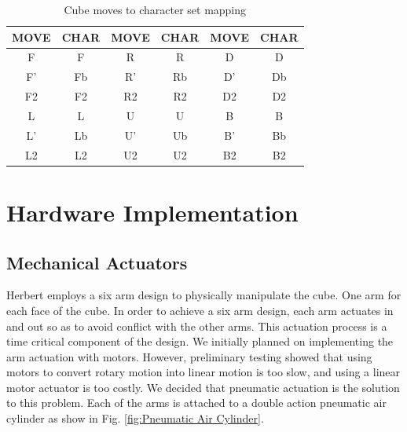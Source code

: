 \documentclass[final, letterpaper, 10 pt, conference, twocolumn]{IEEEtran}
\begin{document}
\begin{table}[!ht]
\caption{Cube moves to character set mapping}
\label{table:moves table}
\centering
\begin{tabular}{|c|c|c|c|c|c|}
\hline
\textbf{MOVE} & \textbf{CHAR} & \textbf{MOVE} & \textbf{CHAR} & \textbf{MOVE} & \textbf{CHAR} \\ \hline
F             & F              & R             & R              & D             & D             \\ \hline
F'            & Fb              & R'            & Rb              & D'            & Db            \\ \hline
F2            & F2              & R2            & R2              & D2            & D2             \\ \hline
L             & L              & U             & U             & B             & B             \\ \hline
L'            & Lb              & U'            & Ub             & B'            & Bb             \\ \hline
L2            & L2              & U2            & U2             & B2            & B2             \\ \hline
\end{tabular}
\end{table}

\section{Hardware Implementation}
\subsection{Mechanical Actuators}
\label{sec:Mechanical Actuators}
Herbert employs a six arm design to physically manipulate the cube. One arm for each face of the cube. In order to achieve a six arm design, each arm actuates in and out so as to avoid conflict
with the other arms. This actuation process is a time critical component of
the design.  We initially planned on implementing the
arm actuation with motors.  However, preliminary testing showed that using
motors to convert rotary motion into linear motion is too slow, and using a linear motor
actuator is too costly. We decided that pneumatic actuation is the solution to this problem.  Each of the arms is attached to a double action pneumatic air cylinder as show in Fig. \ref{fig:Pneumatic Air Cylinder}.
\end{document}
